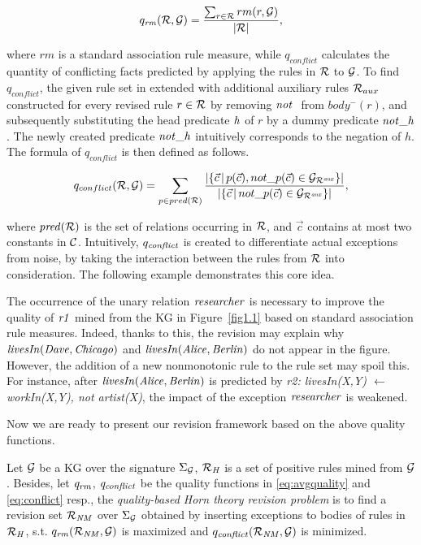 \begin{equation}
q_{\mathit{rm}}(\mathcal{R},\mathcal{G})=\dfrac{\sum_{r\in \mathcal{R}}rm(r,\mathcal{G})}{|\mathcal{R}|}
\label{eq:avgquality},
\end{equation}

\noindent where $rm$ is a standard association rule measure, while $q_{conflict}$ calculates the quantity of conflicting facts predicted by applying the rules in $\mathcal{R}$ to $\mathcal{G}$. To find $q_{conflict}$, the given rule set in extended with additional auxiliary rules $\mathcal{R}_{aux}$ constructed for every revised rule $r \in \mathcal{R}$ by removing $\naf$ from $body^-(r)$, and subsequently substituting the head predicate $\mathit{h}$ of $r$ by a dummy predicate $\mathit{not\_h}$. The newly created predicate $\mathit{not\_h}$ intuitively corresponds to the negation of $h$. The formula of $q_{conflict}$ is then defined as follows.

\begin{equation}
q_{conflict}(\mathcal{R},\mathcal{G})=\sum_{p\in pred(\mathcal{R})} \dfrac{|\{ \vec{c}\,|\,p(\vec{c}),not\_p(\vec{c})\in \mathcal{G}_{\mathcal{R}^{\mathit{aux}}}\} |}{|\{ \vec{c}\,|\,not\_p(\vec{c})\in \mathcal{G}_{\mathcal{R}^{\mathit{aux}}}\} |}
\label{eq:conflict},
\end{equation}

\noindent where $\mathit{pred(\mathcal{R})}$ is the set of relations occurring in $\mathcal{R}$, and $\vec{c}$ contains at most two constants in $\mathcal{C}$. Intuitively, $q_{\mathit{conflict}}$ is created to differentiate actual exceptions from noise, by taking the interaction between the rules from $\mathcal{R}$ into consideration. The following example demonstrates this core idea.

\begin{example}

The occurrence of the unary relation $\mathit{researcher}$ is necessary to improve the quality of $\mathit{r1}$ mined from the KG in Figure~\ref{fig1.1} based on standard association rule measures. Indeed, thanks to this, the revision may explain why $\mathit{livesIn(Dave,Chicago)}$ and $\mathit{livesIn(Alice,Berlin)}$ do not appear in the figure. However, the addition of a new nonmonotonic rule to the rule set may spoil this. For instance, after $\mathit{livesIn(Alice,Berlin)}$ is predicted by \textit{r2: livesIn(X,Y) $\leftarrow$ workIn(X,Y), not artist(X)}, the impact of the exception $\mathit{researcher}$ is weakened.
\end{example}

Now we are ready to present our revision framework based on the above quality functions.

\begin{definition} \label{def:qhtr}
Let $\mathcal{G}$ be a KG over the signature $\Sigma_{\mathcal{G}}$, $\mathcal{R}_{\mathit{H}}$ is a set of positive rules mined from $\mathcal{G}$. Besides, let $\mathit{q_{rm}}$, $\mathit{q_{conflict}}$ be the quality functions in \ref{eq:avgquality} and \ref{eq:conflict} resp., the \emph{quality-based Horn theory revision problem} is to find a revision set $\mathcal{R}_{\mathit{NM}}$ over $\Sigma_{\mathcal{G}}$ obtained by inserting exceptions to bodies of rules in $\mathcal{R}_{\mathit{H}}$, s.t. $q_{\mathit{rm}}(\mathcal{R}_{\mathit{NM}},\mathcal{G})$ is maximized and $q_{\mathit{conflict}}(\mathcal{R}_{\mathit{NM}},\mathcal{G})$ is minimized.
\end{definition}

